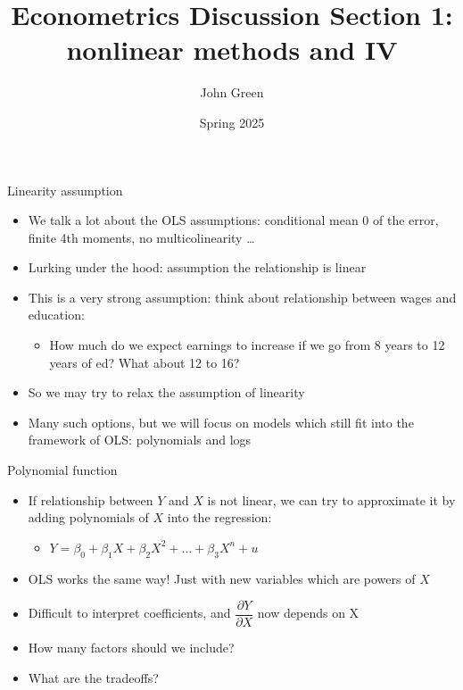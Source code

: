 \documentclass[aspectratio=169]{beamer}
\title{Econometrics Discussion Section 1: nonlinear methods and IV}
\author{John Green}
\date{Spring 2025}
\begin{document}
\begin{frame}
    \titlepage 
\end{frame}

\begin{frame}{Linearity assumption}
    \begin{itemize}
        \item We talk a lot about the OLS assumptions: conditional mean 0 of the error, finite 4th moments, no multicolinearity \dots
        \item Lurking under the hood: assumption the relationship is linear
        \item This is a very strong assumption: think about relationship between wages and education:
        \begin{itemize}
            \item How much do we expect earnings to increase if we go from 8 years to 12 years of ed? What about 12 to 16?
        \end{itemize}
        \item So we may try to relax the assumption of linearity
        \item Many such options, but we will focus on models which still fit into the framework of OLS: polynomials and logs
    \end{itemize}
\end{frame}

\begin{frame}{Polynomial function}
    \begin{itemize}
        \item If relationship between $Y$ and $X$ is not linear, we can try to approximate it by adding polynomials of $X$ into the regression: 
        \begin{itemize}
            \item $Y = \beta_0 + \beta_1 X + \beta_2 X^2 + \dots + \beta_3 X^n + u$
        \end{itemize}
        \item OLS works the same way! Just with new variables which are powers of $X$
        \item Difficult to interpret coefficients, and $\dfrac{\partial Y}{\partial X}$ now depends on X
        \item How many factors should we include? 
        \item What are the tradeoffs?
    \end{itemize}
\end{frame}
\end{document}
